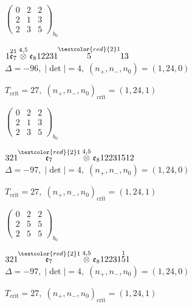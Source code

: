 \documentclass[10pt]{article}
\begin{document}
\hspace{2em}$\left(\begin{smallmatrix}0 & 2 & 2 \\ 2 & 1 & 3 \\ 2 & 3 & 5\end{smallmatrix}\right)_{\!b_0}$

\smallskip

$1\overset{21}{\mathfrak{e}_7}\overset{4,5}{\otimes}\mathfrak{e}_812231\overset{\textcolor{red}{2}1}{5}13$ \quad $\Delta=-96,\; |\det|=4,\; (n_+,n_-,n_0)=(1,24,0)$

\hspace{1em}$T_{\text{crit}}=27,\; (n_+,n_-,n_0)_{\text{crit}}=(1,24,1)$

\hspace{2em}$\left(\begin{smallmatrix}0 & 2 & 2 \\ 2 & 1 & 3 \\ 2 & 3 & 5\end{smallmatrix}\right)_{\!b_0}$

\smallskip

$321\overset{\textcolor{red}{2}1}{\mathfrak{e}_7}\overset{4,5}{\otimes}\mathfrak{e}_812231512$ \quad $\Delta=-97,\; |\det|=4,\; (n_+,n_-,n_0)=(1,24,0)$

\hspace{1em}$T_{\text{crit}}=27,\; (n_+,n_-,n_0)_{\text{crit}}=(1,24,1)$

\hspace{2em}$\left(\begin{smallmatrix}0 & 2 & 2 \\ 2 & 5 & 5 \\ 2 & 5 & 5\end{smallmatrix}\right)_{\!b_0}$

\smallskip

$321\overset{\textcolor{red}{2}1}{\mathfrak{e}_7}\overset{4,5}{\otimes}\mathfrak{e}_812231\overset{1}{5}1$ \quad $\Delta=-97,\; |\det|=4,\; (n_+,n_-,n_0)=(1,24,0)$

\hspace{1em}$T_{\text{crit}}=27,\; (n_+,n_-,n_0)_{\text{crit}}=(1,24,1)$
\end{document}
